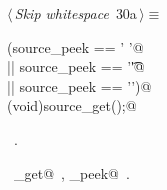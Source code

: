 \documentclass[a4paper]{report}
\begin{document}
\begin{flushleft} \small
\begin{minipage}{\linewidth}\label{scrap50}\raggedright\small
{} $\langle\,${\it Skip whitespace}\nobreak\ {\footnotesize {30a}}$\,\rangle\equiv$
\vspace{-1ex}
\begin{list}{}{} \item
\mbox{}\verb@while (source_peek == ' '@\\
\mbox{}\verb@       || source_peek == '\t'@\\
\mbox{}\verb@       || source_peek == '\n')@\\
\mbox{}\verb@   (void)source_get();@\\
\mbox{}\verb@@{\NWsep}
\end{list}
\vspace{-1.5ex}
\footnotesize
\begin{list}{}{\setlength{\itemsep}{-\parsep}\setlength{\itemindent}{-\leftmargin}}
\item \NWtxtMacroRefIn\ .
\item \NWtxtIdentsUsed\nobreak\  \verb@source_get@\nobreak\ , \verb@source_peek@\nobreak\ .
\item{}
\end{list}
\end{minipage}\vspace{4ex}
\end{flushleft}
\end{document}
